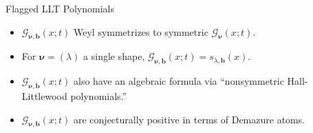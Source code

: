 \documentclass[dvipsnames]{beamer}
\newcommand{\xx}{x}%
\newcommand{\Gcal}{{\mathcal G}}
\newcommand{\nubold}{{\boldsymbol \nu }}
\newcommand{\bb}{{\mathbf b}}
\theoremstyle{definition}
\newcounter{c}
\begin{document}
\begin{frame}{Flagged LLT Polynomials}
  \begin{itemize}
  \item \(\Gcal_{\nubold,\bb}(x;t)\) Weyl symmetrizes to symmetric
    \(\Gcal_\nubold(\xx;t)\).\pause
  \item For \(\nubold = (\lambda)\) a single shape, \(\Gcal_{\nubold,\bb}(x;t) = s_{\lambda,\bb}(x)\).\pause
  \item \(\Gcal_{\nubold,\bb}(x;t)\) also have an algebraic formula via
    ``nonsymmetric Hall-Littlewood polynomials.'' \pause
  \item \(\Gcal_{\nubold,\bb}(x;t)\) are conjecturally positive in terms
    of Demazure atoms.
  \end{itemize}
\end{frame}
\end{document}
